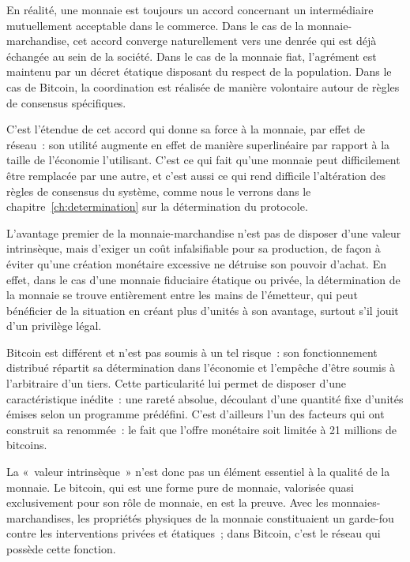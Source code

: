 En réalité, une monnaie est toujours un accord concernant un intermédiaire mutuellement acceptable dans le commerce. Dans le cas de la monnaie-marchandise, cet accord converge naturellement vers une denrée qui est déjà échangée au sein de la société. Dans le cas de la monnaie fiat, l'agrément est maintenu par un décret étatique disposant du respect de la population. Dans le cas de Bitcoin, la coordination est réalisée de manière volontaire autour de règles de consensus spécifiques.

C'est l'étendue de cet accord qui donne sa force à la monnaie, par effet de réseau~: son utilité augmente en effet de manière superlinéaire par rapport à la taille de l'économie l'utilisant. C'est ce qui fait qu'une monnaie peut difficilement être remplacée par une autre, et c'est aussi ce qui rend difficile l'altération des règles de consensus du système, comme nous le verrons dans le chapitre~\ref{ch:determination} sur la détermination du protocole.

L'avantage premier de la monnaie-marchandise n'est pas de disposer d'une valeur intrinsèque, mais d'exiger un coût infalsifiable pour sa production, de façon à éviter qu'une création monétaire excessive ne détruise son pouvoir d'achat. En effet, dans le cas d'une monnaie fiduciaire étatique ou privée, la détermination de la monnaie se trouve entièrement entre les mains de l'émetteur, qui peut bénéficier de la situation en créant plus d'unités à son avantage, surtout s'il jouit d'un privilège légal.

Bitcoin est différent et n'est pas soumis à un tel risque~: son fonctionnement distribué répartit sa détermination dans l'économie et l'empêche d'être soumis à l'arbitraire d'un tiers. Cette particularité lui permet de disposer d'une caractéristique inédite~: une rareté absolue, découlant d'une quantité fixe d'unités émises selon un programme prédéfini. C'est d'ailleurs l'un des facteurs qui ont construit sa renommée~: le fait que l'offre monétaire soit limitée à 21 millions de bitcoins.

La «~valeur intrinsèque~» n'est donc pas un élément essentiel à la qualité de la monnaie. Le bitcoin, qui est une forme pure de monnaie, valorisée quasi exclusivement pour son rôle de monnaie, en est la preuve. Avec les monnaies-marchandises, les propriétés physiques de la monnaie constituaient un garde-fou contre les interventions privées et étatiques~; dans Bitcoin, c'est le réseau qui possède cette fonction.

